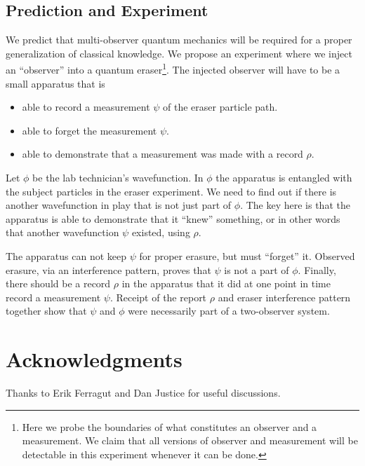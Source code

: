 \documentclass[12pt,a4paper]{article}
\begin{document}
\subsection{Prediction and Experiment}

We predict that multi-observer quantum mechanics will be required for a proper generalization of classical knowledge.  We propose an experiment where we inject an ``observer'' into a quantum eraser\footnote{Here we probe the boundaries of what constitutes an observer and a measurement.  We claim that all versions of observer and measurement will be detectable in this experiment whenever it can be done.}.  The injected observer will have to be a small apparatus that is
\begin{itemize}
   \item able to record a measurement $\psi$ of the eraser particle path.
   \item able to forget the measurement $\psi$.
   \item able to demonstrate that a measurement was made with a record $\rho$.
\end{itemize}
Let $\phi$ be the lab technician's wavefunction.  In $\phi$ the apparatus is entangled with the subject particles in the eraser experiment.  We need to find out if there is another wavefunction in play that is not just part of $\phi$.  The key here is that the apparatus is able to demonstrate that it ``knew'' something, or in other words that another wavefunction $\psi$ existed, using $\rho$.

The apparatus can not keep $\psi$ for proper erasure, but must ``forget'' it.  Observed erasure, via an interference pattern, proves that $\psi$ is not a part of $\phi$.  Finally, there should be a record $\rho$ in the apparatus that it did at one point in time record a measurement $\psi$.  Receipt of the report $\rho$ and eraser interference pattern together show that $\psi$ and $\phi$ were necessarily part of a two-observer system.

\section{Acknowledgments}
Thanks to Erik Ferragut and Dan Justice for useful discussions.



\end{document}
